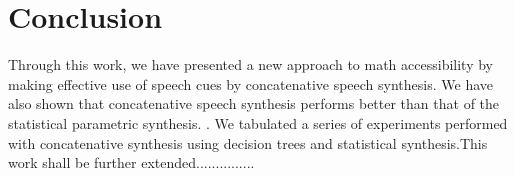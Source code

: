 \documentclass{acm_proc_article-sp}
\begin{document}
\section{Conclusion}

 Through this work, we have  presented a new approach to math accessibility by making effective use of speech cues by concatenative speech synthesis. We have also shown that concatenative speech synthesis performs better than that of the statistical parametric synthesis.
. We tabulated a series of experiments performed with  concatenative synthesis using decision trees and statistical synthesis.This work shall be further extended...............




 




%
%












\balancecolumns
\end{document}
